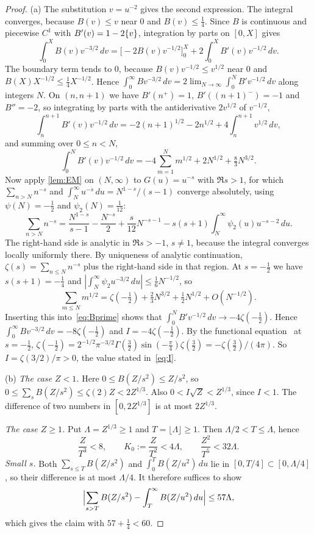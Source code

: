 \begin{proof}
(a) The substitution $v=u^{-2}$ gives the second expression. The integral converges, because $B(v)\le v$ near $0$ and $B(v)\le\frac14$. Since $B$ is continuous and piecewise $C^1$ with $B'(v)=1-2\{v\}$, integration by parts on $[0,X]$ gives
\[
\int_0^XB(v)v^{-3/2}\,dv=\bigl[-2B(v)v^{-1/2}\bigr]_0^X+2\int_0^XB'(v)v^{-1/2}\,dv .
\]
The boundary term tends to $0$, because $B(v)v^{-1/2}\le v^{1/2}$ near $0$ and $B(X)X^{-1/2}\le\frac14X^{-1/2}$. Hence $\int_0^\infty Bv^{-3/2}\,dv=2\lim_{N\to\infty}\int_0^NB'v^{-1/2}\,dv$ along integers $N$. On $(n,n+1)$ we have $B'(n^+)=1$, $B'((n+1)^-)=-1$ and $B''=-2$, so integrating by parts with the antiderivative $2v^{1/2}$ of $v^{-1/2}$,
\[
\int_n^{n+1}B'(v)v^{-1/2}\,dv=-2(n+1)^{1/2}-2n^{1/2}+4\int_n^{n+1}v^{1/2}\,dv,
\]
and summing over $0\le n<N$,
\begin{equation}\label{eq:Bprime}
\int_0^NB'(v)v^{-1/2}\,dv=-4\sum_{m=1}^Nm^{1/2}+2N^{1/2}+\tfrac83N^{3/2}.
\end{equation}
Now apply \cref{lem:EM} on $(N,\infty)$ to $G(u)=u^{-s}$ with $\Re s>1$, for which $\sum_{n>N}n^{-s}$ and $\int_N^\infty u^{-s}\,du=N^{1-s}/(s-1)$ converge absolutely, using $\psi(N)=-\frac12$ and $\psi_2(N)=\frac1{12}$:
\[
\sum_{n>N}n^{-s}=\frac{N^{1-s}}{s-1}-\frac{N^{-s}}2+\frac s{12}N^{-s-1}-s(s+1)\int_N^\infty\psi_2(u)u^{-s-2}\,du .
\]
The right-hand side is analytic in $\Re s>-1$, $s\ne1$, because the integral converges locally uniformly there. By uniqueness of analytic continuation, $\zeta(s)=\sum_{n\le N}n^{-s}$ plus the right-hand side in that region. At $s=-\frac12$ we have $s(s+1)=-\frac14$ and $|\int_N^\infty\psi_2u^{-3/2}\,du|\le\frac16N^{-1/2}$, so
\[
\sum_{m\le N}m^{1/2}=\zeta(-\tfrac12)+\tfrac23N^{3/2}+\tfrac12N^{1/2}+O(N^{-1/2}).
\]
Inserting this into~\eqref{eq:Bprime} shows that $\int_0^NB'v^{-1/2}\,dv\to-4\zeta(-\frac12)$. Hence $\int_0^\infty Bv^{-3/2}\,dv=-8\zeta(-\frac12)$ and $I=-4\zeta(-\frac12)$. By the functional equation~\cite[Corollary~10.4]{MV2007} at $s=-\frac12$, $\zeta(-\frac12)=2^{-1/2}\pi^{-3/2}\Gamma(\frac32)\sin(-\frac\pi4)\zeta(\frac32)=-\zeta(\frac32)/(4\pi)$. So $I=\zeta(3/2)/\pi>0$, the value stated in~\eqref{eq:I}.

(b) \emph{The case $Z<1$.} Here $0\le B(Z/s^2)\le Z/s^2$, so $0\le\sum_sB(Z/s^2)\le\zeta(2)Z<2Z^{1/3}$. Also $0<I\sqrt Z<Z^{1/3}$, since $I<1$. The difference of two numbers in $[0,2Z^{1/3}]$ is at most $2Z^{1/3}$.

\emph{The case $Z\ge1$.} Put $\Lambda=Z^{1/3}\ge1$ and $T=\lfloor\Lambda\rfloor\ge1$. Then $\Lambda/2<T\le\Lambda$, hence
\begin{equation}\label{eq:b1}
\frac Z{T^3}<8,\qquad K_0:=\frac Z{T^2}<4\Lambda,\qquad \frac{Z^2}{T^5}<32\Lambda .
\end{equation}
\emph{Small $s$.} Both $\sum_{s\le T}B(Z/s^2)$ and $\int_0^TB(Z/u^2)\,du$ lie in $[0,T/4]\subset[0,\Lambda/4]$, so their difference is at most $\Lambda/4$. It therefore suffices to show
\begin{equation}\label{eq:b2}
\Bigl|\sum_{s>T}B(Z/s^2)-\int_T^\infty B(Z/u^2)\,du\Bigr|\le57\Lambda ,
\end{equation}
which gives the claim with $57+\frac14<60$.


\end{proof}
